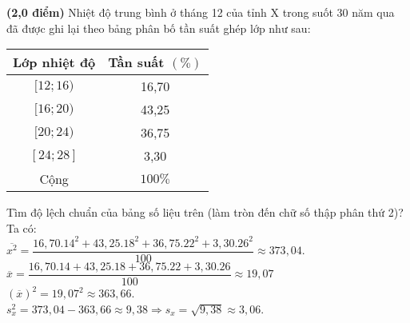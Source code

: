 \begin{bt}%
	\textbf{(2,0 điểm)}
	Nhiệt độ trung bình ở tháng 12 của tỉnh X trong suốt 30 năm qua đã được ghi lại theo bảng phân bố tần suất ghép lớp như sau:
	\begin{center} 
		\begin{tabular}{|c|c|}\hline
			{Lớp nhiệt độ}&{Tần suất $(\%)$}\\
			\hline
			{$[12;16)$}&{16,70}\\
			\hline
			{$[16;20)$}&{43,25}\\
			\hline
			{$[20;24)$}&{36,75}\\
			\hline
			{$[24;28]$}&{3,30}\\
			\hline
			{Cộng}&{$100\%$}\\
			\hline
		\end{tabular}
	\end{center}
	Tìm độ lệch chuẩn của bảng số liệu trên (làm tròn đến chữ số thập phân thứ 2)?
	\loigiai
	{Ta có:\\
		$\overline{x^2}=\dfrac{16,70.14^2+43,25.18^2+36,75.22^2+3,30.26^2}{100}\approx373,04$.\\
		$\overline{x}=\dfrac{16,70.14+43,25.18+36,75.22+3,30.26}{100}\approx19,07$\\
		$(\overline{x})^2=19,07^2\approx363,66$.\\
		$s_x^2=373,04-363,66\approx9,38 \Rightarrow s_x=\sqrt{9,38}\approx 3,06$.
	}
\end{bt}

